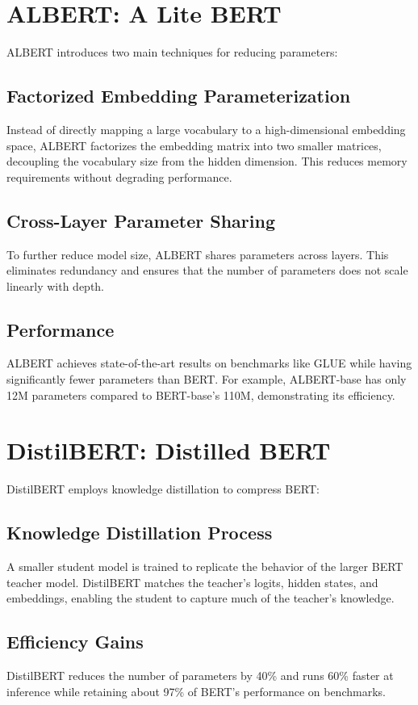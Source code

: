 \documentclass{article}
\begin{document}
\section{ALBERT: A Lite BERT}
ALBERT introduces two main techniques for reducing parameters:

\subsection{Factorized Embedding Parameterization}
Instead of directly mapping a large vocabulary to a high-dimensional embedding space, ALBERT factorizes the embedding matrix into two smaller matrices, decoupling the vocabulary size from the hidden dimension. This reduces memory requirements without degrading performance.

\subsection{Cross-Layer Parameter Sharing}
To further reduce model size, ALBERT shares parameters across layers. This eliminates redundancy and ensures that the number of parameters does not scale linearly with depth.

\subsection{Performance}
ALBERT achieves state-of-the-art results on benchmarks like GLUE while having significantly fewer parameters than BERT. For example, ALBERT-base has only 12M parameters compared to BERT-base's 110M, demonstrating its efficiency.

\section{DistilBERT: Distilled BERT}
DistilBERT employs knowledge distillation to compress BERT:

\subsection{Knowledge Distillation Process}
A smaller student model is trained to replicate the behavior of the larger BERT teacher model. DistilBERT matches the teacher's logits, hidden states, and embeddings, enabling the student to capture much of the teacher's knowledge.

\subsection{Efficiency Gains}
DistilBERT reduces the number of parameters by 40\% and runs 60\% faster at inference while retaining about 97\% of BERT's performance on benchmarks.
\end{document}

